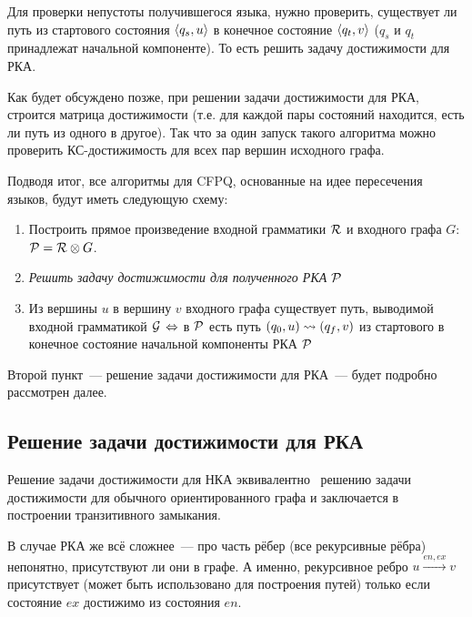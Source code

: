 Для проверки непустоты получившегося языка, нужно проверить, существует ли путь из стартового состояния $\langle q_s, u \rangle$ в конечное состояние $\langle q_t, v \rangle$ ($q_s$ и $q_t$ принадлежат начальной компоненте). То есть решить задачу достижимости для РКА.

Как будет обсуждено позже, при решении задачи достижимости для РКА, строится матрица достижимости (т.е. для каждой пары состояний находится, есть ли путь из одного в другое). Так что за один запуск такого алгоритма можно проверить КС-достижимость для всех пар вершин исходного графа. 

Подводя итог, все алгоритмы для CFPQ, основанные на идее пересечения языков, будут иметь следующую схему:
\begin{enumerate}
    \item Построить прямое произведение входной грамматики $\mathcal{R}$ и входного графа $G$: $\mathcal{P} = \mathcal{R} \otimes G$.
    \item \textit{Решить задачу достижимости для полученного РКА $\mathcal{P}$}
    \item Из вершины $u$ в вершину $v$ входного графа существует путь, выводимой входной грамматикой $\mathcal{G}$ $\Leftrightarrow$ в $\mathcal{P}$ есть путь $(q_0, u) \rightsquigarrow (q_f, v)$ из стартового в конечное состояние начальной компоненты РКА $\mathcal{P}$
\end{enumerate}

Второй пункт~--- решение задачи достижимости для РКА~--- будет подробно рассмотрен далее.

\subsection{Решение задачи достижимости для РКА}

Решение задачи достижимости для НКА эквивалентно~\cite{Yannakakis1990} решению задачи достижимости для обычного ориентированного графа и заключается в построении транзитивного замыкания.

\begin{definition}
  \TODO
\end{definition}

В случае РКА же всё сложнее~--- про часть рёбер (все рекурсивные рёбра) непонятно, присутствуют ли они в графе. А именно, рекурсивное ребро $u \xrightarrow{en, ex} v$ присутствует (может быть использовано для построения путей) только если состояние $ex$ достижимо из состояния $en$.

